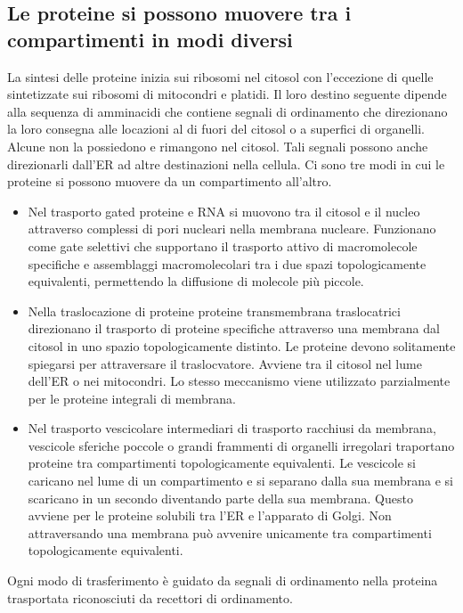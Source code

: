 \subsection{Le proteine si possono muovere tra i compartimenti in modi diversi}
La sintesi delle proteine inizia sui ribosomi nel citosol con l'eccezione di quelle sintetizzate sui ribosomi di mitocondri e platidi. Il loro destino seguente dipende alla sequenza
di amminacidi che contiene segnali di ordinamento che direzionano la loro consegna alle locazioni al di fuori del citosol o a superfici di organelli. Alcune non la possiedono e 
rimangono nel citosol. Tali segnali possono anche direzionarli dall'ER ad altre destinazioni nella cellula. Ci sono tre modi in cui le proteine si possono muovere da un compartimento 
all'altro.
\begin{itemize}
	\item Nel trasporto gated proteine e RNA si muovono tra il citosol e il nucleo attraverso complessi di pori nucleari nella membrana nucleare. Funzionano come 
		gate selettivi che supportano il trasporto attivo di macromolecole specifiche e assemblaggi macromolecolari tra i due spazi topologicamente equivalenti, permettendo la
		diffusione di molecole pi\`u piccole.
	\item Nella traslocazione di proteine proteine transmembrana traslocatrici direzionano il trasporto di proteine specifiche attraverso una membrana dal citosol in uno spazio 
		topologicamente distinto. Le proteine devono solitamente spiegarsi per attraversare il traslocvatore. Avviene tra il citosol nel lume dell'ER o nei mitocondri. Lo 
		stesso meccanismo viene utilizzato parzialmente per le proteine integrali di membrana.
	\item Nel trasporto vescicolare intermediari di trasporto racchiusi da membrana, vescicole sferiche poccole o grandi frammenti di organelli irregolari traportano proteine tra
		compartimenti topologicamente equivalenti. Le vescicole si caricano nel lume di un compartimento e si separano dalla sua membrana e si scaricano in un secondo diventando
		parte della sua membrana. Questo avviene per le proteine solubili tra l'ER e l'apparato di Golgi. Non attraversando una membrana pu\`o avvenire unicamente tra 
		compartimenti topologicamente equivalenti.
\end{itemize}
Ogni modo di trasferimento \`e guidato da segnali di ordinamento nella proteina trasportata riconosciuti da recettori di ordinamento. 
